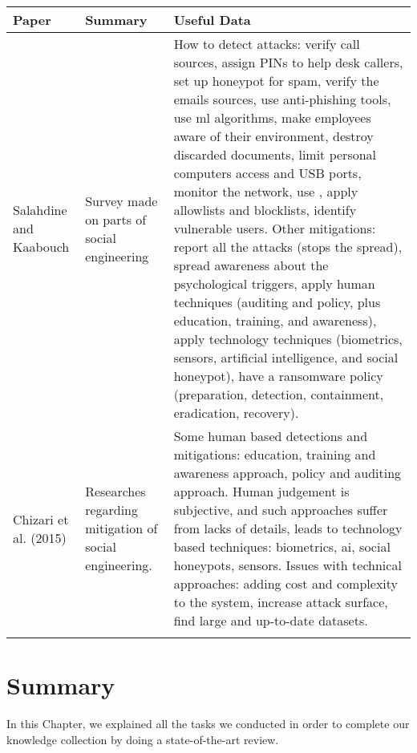\begin{small}
\begin{landscape}
	\begin{tabularx}{\linewidth}{p{1.5cm}|p{3cm}X}
		\toprule[0.8mm]
		\textbf{Paper} & \textbf{Summary} & \textbf{Useful Data} \\
		\midrule[0.8mm]
		Salahdine and Kaabouch \cite{salahdine_social_2019} & Survey made on parts of social engineering & How to detect attacks: verify call sources, assign PINs to help desk callers, set up honeypot for spam, verify the emails sources, use anti-phishing tools, use \gls{ml} algorithms, make employees aware of their environment, destroy discarded documents, limit personal computers access and USB ports, monitor the network, use \citeproperref{SERA}{https://bit.ly/3s8egdH}{2022}{10}{20}, apply allowlists and blocklists, identify vulnerable users. Other mitigations: report all the attacks (stops the spread), spread awareness about the psychological triggers, apply human techniques (auditing and policy, plus education, training, and awareness), apply technology techniques (biometrics, sensors, artificial intelligence, and social honeypot), have a ransomware policy (preparation, detection, containment, eradication, recovery). \\
		\midrule %
		Chizari et al. \cite{chizari_social_2015} (2015) & Researches regarding mitigation of social engineering. & Some human based detections and mitigations: education, training and awareness approach, policy and auditing approach. Human judgement is subjective, and such approaches suffer from lacks of details, leads to technology based techniques: biometrics, \gls{ai}, social \glspl{honeypot}, sensors. Issues with technical approaches: adding cost and complexity to the system, increase attack surface, find large and up-to-date datasets. \\
		\bottomrule[0.8mm]
		\caption{Social engineering attacks comparison}
		\label{table:state_review_results_socialengineering}
	\end{tabularx} 

    
\end{landscape}
\end{small}
\section{Summary}
\label{sec:state_summary}

In this Chapter, we explained all the tasks we conducted in order to complete our knowledge collection by doing a state-of-the-art review.

